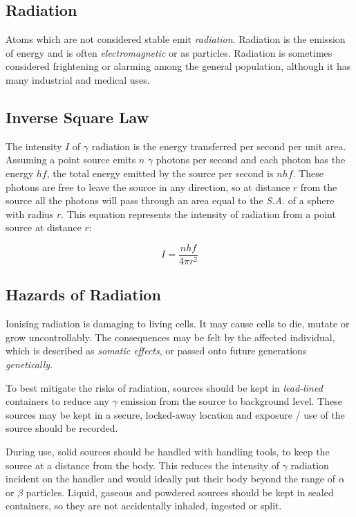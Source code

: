 \documentclass[12pt]{article}
\begin{document}
\subsection{Radiation}
\label{sec:orgdf32fac}

Atoms which are not considered stable emit \emph{radiation}. Radiation is the emission of energy and is often \emph{electromagnetic} or as particles. Radiation is sometimes considered frightening or alarming among the general population, although it has many industrial and medical uses.

\subsection{Inverse Square Law}
\label{sec:org08a3887}

The intensity \(I\) of \(\gamma\) radiation is the energy transferred per second per unit area. Assuming a point source emits \(n\) \(\gamma\) photons per second and each photon has the energy \(hf\), the total energy emitted by the source per second is \(nhf\). These photons are free to leave the source in any direction, so at distance \(r\) from the source all the photons will pass through an area equal to the \emph{S.A.} of a sphere with radius \(r\). This equation represents the intensity of radiation from a point source at distance \(r\):

\[I = \dfrac{nhf}{4 \pi r^2}\]

\subsection{Hazards of Radiation}
\label{sec:org5f7ba88}

Ionising radiation is damaging to living cells. It may cause cells to die, mutate or grow uncontrollably. The consequences may be felt by the affected individual, which is described as \emph{somatic effects}, or passed onto future generations \emph{genetically}.

To best mitigate the risks of radiation, sources should be kept in \emph{lead-lined} containers to reduce any \(\gamma\) emission from the source to background level. These sources may be kept in a secure, locked-away location and exposure / use of the source should be recorded.

During use, solid sources should be handled with handling tools, to keep the source at a distance from the body. This reduces the intensity of \(\gamma\) radiation incident on the handler and would ideally put their body beyond the range of \(\alpha\) or \(\beta\) particles. Liquid, gaseous and powdered sources should be kept in sealed containers, so they are not accidentally inhaled, ingested or split.
\end{document}
